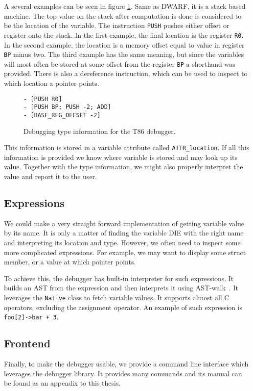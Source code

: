 A several examples can be seen in figure \ref{fig:t86dbg-vm}. Same as DWARF, it
is a stack based machine. The top value on the stack after computation is done
is considered to be the location of the variable. The instruction \texttt{PUSH}
pushes either offset or register onto the stack. In the first example, the
final location is the register \texttt{R0}. In the second example, the location
is a memory offset equal to value in register \texttt{BP} minus two. The third
example has the same meaning, but since the variables will most often be stored
at some offset from the register \texttt{BP} a shorthand was provided. There is
also a dereference instruction, which can be used to inspect to which location
a pointer points.

\begin{figure}
    \begin{lstlisting}
- [PUSH R0]
- [PUSH BP; PUSH -2; ADD]
- [BASE_REG_OFFSET -2]
    \end{lstlisting}
    \caption{Debugging type information for the T86 debugger.}
    \label{fig:t86dbg-vm}
\end{figure}

This information is stored in a variable attribute called
\texttt{ATTR\_location}. If all this information is provided we know where
variable is stored and may look up its value. Together with the type
information, we might also properly interpret the value and report it to the
user.

\subsection{Expressions}
We could make a very straight forward implementation of getting variable value
by its name. It is only a matter of finding the variable DIE with the right
name and interpreting its location and type. However, we often need to inspect
some more complicated expressions. For example, we may want to display some
struct member, or a value at which pointer points.

To achieve this, the debugger has built-in interpreter for such expressions. It
builds an AST from the expression and then interprets it using
AST-walk~\cite{crafting-interpreters}. It leverages the \texttt{Native} class
to fetch variable values. It supports almost all C operators, excluding the
assignment operator. An example of such expression is \texttt{foo[2]->bar + 3}.

\subsection{Frontend}
Finally, to make the debugger usable, we provide a command line interface which
leverages the debugger library. It provides many commands and its manual can be
found as an appendix to this thesis.

